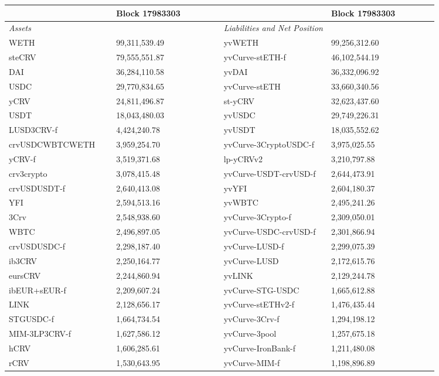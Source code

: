 
\begin{longtable}{@{}p{0.25\linewidth}p{0.25\linewidth}p{0.25\linewidth}p{0.25\linewidth}@{}}

\toprule


& Block 17983303 & & Block 17983303 \\

\midrule
\textit{Assets} & & \textit{Liabilities and Net Position} \\
WETH & 99,311,539.49 & yvWETH & 99,256,312.60 \\
steCRV & 79,555,551.87 & yvCurve-stETH-f & 46,102,544.19 \\
DAI & 36,284,110.58 & yvDAI & 36,332,096.92 \\
USDC & 29,770,834.65 & yvCurve-stETH & 33,660,340.56 \\
yCRV & 24,811,496.87 & st-yCRV & 32,623,437.60 \\
USDT & 18,043,480.03 & yvUSDC & 29,749,226.31 \\
LUSD3CRV-f & 4,424,240.78 & yvUSDT & 18,035,552.62 \\
crvUSDCWBTCWETH & 3,959,254.70 & yvCurve-3CryptoUSDC-f & 3,975,025.55 \\
yCRV-f & 3,519,371.68 & lp-yCRVv2 & 3,210,797.88 \\
crv3crypto & 3,078,415.48 & yvCurve-USDT-crvUSD-f & 2,644,473.91 \\
crvUSDUSDT-f & 2,640,413.08 & yvYFI & 2,604,180.37 \\
YFI & 2,594,513.16 & yvWBTC & 2,495,241.26 \\
3Crv & 2,548,938.60 & yvCurve-3Crypto-f & 2,309,050.01 \\
WBTC & 2,496,897.05 & yvCurve-USDC-crvUSD-f & 2,301,866.94 \\
crvUSDUSDC-f & 2,298,187.40 & yvCurve-LUSD-f & 2,299,075.39 \\
ib3CRV & 2,250,164.77 & yvCurve-LUSD & 2,172,615.76 \\
eursCRV & 2,244,860.94 & yvLINK & 2,129,244.78 \\
ibEUR+sEUR-f & 2,209,607.24 & yvCurve-STG-USDC & 1,665,612.88 \\
LINK & 2,128,656.17 & yvCurve-stETHv2-f & 1,476,435.44 \\
STGUSDC-f & 1,664,734.54 & yvCurve-3Crv-f & 1,294,198.12 \\
MIM-3LP3CRV-f & 1,627,586.12 & yvCurve-3pool & 1,257,675.18 \\
hCRV & 1,606,285.61 & yvCurve-IronBank-f & 1,211,480.08 \\
rCRV & 1,530,643.95 & yvCurve-MIM-f & 1,198,896.89 \\

\end{longtable}
